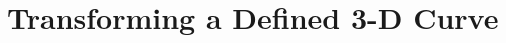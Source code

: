 \documentclass[acmlarge,nonacm=true]{acmart}
\begin{document}
\author{Pang Yu Shao}

\renewcommand{\shortauthors}{Pang Yu Shao}










\tableofcontents
\newpage
\section{Transforming a Defined 3-D Curve}
\end{document}

